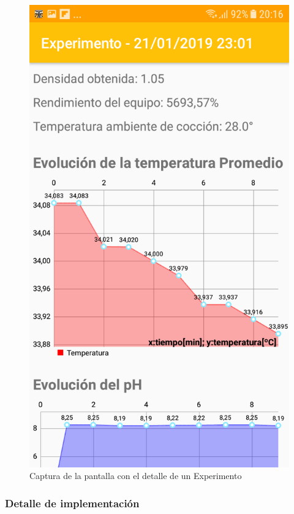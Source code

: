             \begin{figure}[h]
                \centering
                \includegraphics[scale=0.2]{software/ScreenCapture/DetailExperimentActivity.jpg}
                \caption{Captura de la pantalla con el detalle de un Experimento}
                \label{fig:CapturaDetExpAct}
            \end{figure}
            
            \subsubsection{Detalle de implementación}
            
